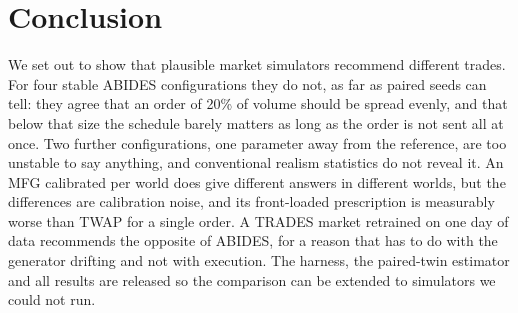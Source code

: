 \section{Conclusion}

We set out to show that plausible market simulators recommend different trades. For four stable ABIDES configurations they do not, as far as \nSeeds{} paired seeds can tell: they agree that an order of 20\% of volume should be spread evenly, and that below that size the schedule barely matters as long as the order is not sent all at once. Two further configurations, one parameter away from the reference, are too unstable to say anything, and conventional realism statistics do not reveal it. An MFG calibrated per world does give different answers in different worlds, but the differences are calibration noise, and its front-loaded prescription is measurably worse than TWAP for a single order. A TRADES market retrained on one day of data recommends the opposite of ABIDES, for a reason that has to do with the generator drifting and not with execution. The harness, the paired-twin estimator and all results are released so the comparison can be extended to simulators we could not run.
